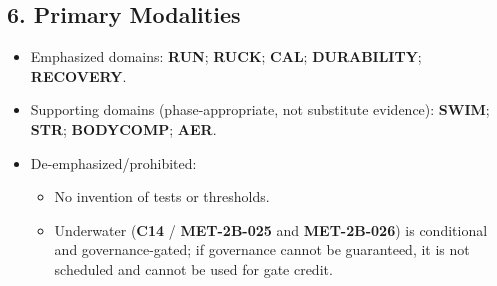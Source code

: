 \documentclass[10pt]{article}
\begin{document}
\subsection*{6. Primary Modalities}

\begin{itemize}
\item Emphasized domains: \textbf{RUN}; \textbf{RUCK}; \textbf{CAL}; \textbf{DURABILITY}; \textbf{RECOVERY}.
\item Supporting domains (phase-appropriate, not substitute evidence): \textbf{SWIM}; \textbf{STR}; \textbf{BODYCOMP}; \textbf{AER}.
\item De-emphasized/prohibited:
  \begin{itemize}
  \item No invention of tests or thresholds.
  \item Underwater (\textbf{C14} / \textbf{MET-2B-025} and \textbf{MET-2B-026}) is conditional and governance-gated; if governance cannot be guaranteed, it is not scheduled and cannot be used for gate credit.
  \end{itemize}
\end{itemize}
\end{document}
